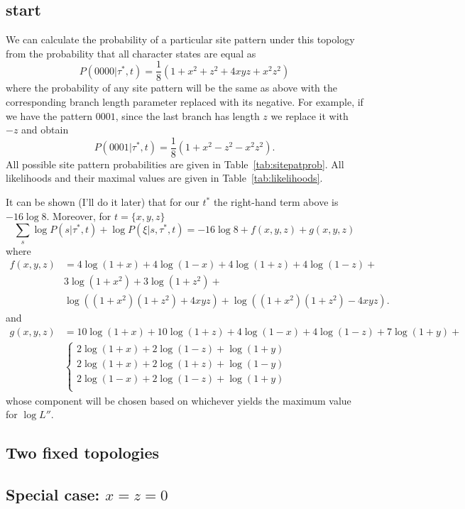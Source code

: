 \documentclass[a4paper]{article}
\begin{document}
\subsection{start}

We can calculate the probability of a particular site pattern under this topology from the probability that all character states are equal as
$$
P(0000|\tau^*,t) = \frac{1}{8}(1+x^2+z^2+4xyz+x^2z^2)
$$
where the probability of any site pattern will be the same as above with the corresponding branch length parameter replaced with its negative.
For example, if we have the pattern $0001$, since the last branch has length $z$ we replace it with $-z$ and obtain
$$
P(0001|\tau^*,t) = \frac{1}{8}(1+x^2-z^2-x^2z^2).
$$
All possible site pattern probabilities are given in Table~\ref{tab:sitepatprob}.
All likelihoods and their maximal values are given in Table~\ref{tab:likelihoods}.

It can be shown (I'll do it later) that for our $t^*$ the right-hand term above is $-16\log 8$.
Moreover, for $t=\{x,y,z\}$
\begin{equation}
\sum_{s} \log P(s | \tau^*, t) + \log P(\xi | s, \tau^*, t) = -16\log 8 + f(x,y,z) + g(x,y,z)
\end{equation}
where
\begin{align}
f(x,y,z) &= 4\log(1+x)+4\log(1-x)+4\log(1+z)+4\log(1-z)+\\
& 3\log(1+x^2)+3\log(1+z^2)+\\
& \log((1+x^2)(1+z^2)+4xyz) + \log((1+x^2)(1+z^2)-4xyz).
\end{align}
and
\begin{align}
g(x,y,z) &= 10\log(1+x)+10\log(1+z)+4\log(1-x)+4\log(1-z)+7\log(1+y)+\\
& \left\{ 
  \begin{array}{l}
  2\log(1+x)+2\log(1-z)+\log(1+y)\\
  2\log(1+x)+2\log(1+z)+\log(1-y)\\
  2\log(1-x)+2\log(1-z)+\log(1+y)\\
  \end{array} \right.
\end{align}
whose component will be chosen based on whichever yields the maximum value for $\log L''$.

\subsection{Two fixed topologies}

\subsection{Special case: $x=z=0$}
\end{document}
